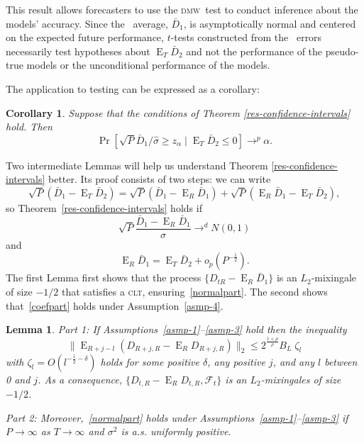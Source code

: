 \documentclass[11pt]{article}
\newtheorem{lem}[thm]{Lemma}
\newtheorem{cor}[thm]{Corollary}
\DeclareMathOperator{\E}{E}
\newcommand{\couplingConstant}{\ensuremath{2^{\frac{1+\rho}{\rho}} B_L}}
\newcommand{\dmw}{\textsc{dmw}}
\newcommand{\clt}{\textsc{clt}}
\begin{document}
This result allows forecasters to use the \dmw\ test to conduct
inference about the models' accuracy.  Since the \oos\ average,
$\bar D_1$, is asymptotically normal and centered on the expected
future performance, $t$-tests constructed from the \oos\ errors
necessarily test hypotheses about $\E_T \bar{D}_2$ and not the
performance of the pseudo-true models or the unconditional
performance of the models.

The application to testing can be expressed as a corollary:
\begin{cor}\label{res:oostest}
Suppose that the conditions of Theorem \ref{res-confidence-intervals}
hold.  Then
\begin{equation}
  \Pr[\sqrt{P}\bar D_{1}/\hat\sigma \geq z_{\alpha} \mid \E_{T}
  \bar{D}_{2} \leq 0] \to^p \alpha.
\end{equation}
\end{cor}

Two intermediate Lemmas will help us understand Theorem
\ref{res-confidence-intervals} better.  Its proof consists of two
steps: we can write
\begin{equation}
  \sqrt{P} (\bar{D}_1 - \E_T \bar{D}_2) = \sqrt{P} (\bar{D}_1 - \E_R
  \bar{D}_1) + \sqrt{P} (\E_R \bar{D}_1 - \E_T \bar{D}_2),
\end{equation}
so Theorem~\ref{res-confidence-intervals} holds if
\begin{equation}\label{normalpart}
  \sqrt{P}\frac{\bar{D}_1 - \E_R \bar{D}_1}{\sigma} \to^d N(0,1)
\end{equation}
and
\begin{equation}\label{coefpart}
  \E_R \bar{D}_1 = \E_T \bar{D}_2 + o_p(P^{-\frac12}).
\end{equation}
The first Lemma first shows that the process $\{D_{tR} - \E_R \bar
D_1\}$ is an $L_2$-mixingale of size $-1/2$ that satisfies a \clt,
ensuring~\eqref{normalpart}.  The second shows that~\eqref{coefpart}
holds under Assumption~\ref{asmp-4}.

\begin{lem}\label{res-mixingale}
  Part 1: If Assumptions~\ref{asmp-1}--\ref{asmp-3} hold then the inequality
  \begin{equation}\label{mixingaleR}
    \lVert \E_{R+j-l}(D_{R+j,R} - \E_R D_{R+j,R}) \rVert_2 \leq
    \couplingConstant \;
    \zeta_l
  \end{equation}
  with $\zeta_l = O(l^{-\frac12 - \delta})$ holds for some positive
  $\delta$, any positive $j$, and any $l$ between 0 and $j$.  As a
  consequence, $\{D_{t,R} - \E_R D_{t,R}, \mathcal F_t\}$ is an
  $L_2$-mixingales of size $-1/2$.  

  \noindent Part
  2: Moreover,~\eqref{normalpart} holds under
  Assumptions~\ref{asmp-1}--\ref{asmp-3} if $P \to \infty$ as $T \to
  \infty$ and $\sigma^2$ is a.s. uniformly positive.
\end{lem}
\end{document}
